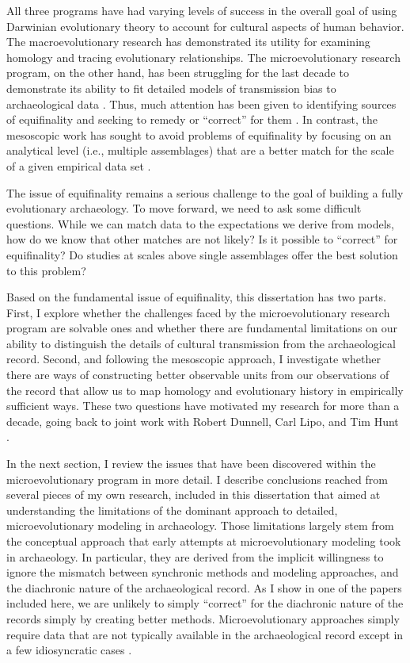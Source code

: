 All three programs have had varying levels of success in the overall goal of using Darwinian evolutionary theory to account for cultural aspects of human behavior. The macroevolutionary research has demonstrated its utility for examining homology and tracing evolutionary relationships. The microevolutionary research program, on the other hand, has been struggling for the last decade to demonstrate its ability to fit detailed models of transmission bias to archaeological data \citep{kandler2019analysing,richerson2008response}. Thus, much attention has been given to identifying sources of equifinality and seeking to remedy or “correct” for them \citep{barrett2019equifinality,premo2010equifinality}. In contrast, the mesoscopic work has sought to avoid problems of equifinality by focusing on an analytical level (i.e., multiple assemblages) that are a better match for the scale of a given empirical data set . 

The issue of equifinality remains a serious challenge to the goal of building a fully evolutionary archaeology.  To move forward, we need to ask some difficult questions.  While we can match data to the expectations we derive from models, how do we know that other matches are not likely?  Is it possible to ``correct'' for equifinality?  Do studies at scales above single assemblages offer the best solution to this problem?  

Based on the fundamental issue of equifinality, this dissertation has two parts.  First, I explore whether the challenges faced by the microevolutionary research program are solvable ones and whether there are fundamental limitations on our ability to distinguish the details of cultural transmission from the archaeological record.  Second, and following the mesoscopic approach, I investigate whether there are ways of constructing better observable units from our observations of the record that allow us to map homology and evolutionary history in empirically sufficient ways. These two questions have motivated my research for more than a decade, going back to joint work with Robert Dunnell, Carl Lipo, and Tim Hunt \citep{Lipo1997,lipomadsen1997,lipomadsenhunt1995b}.  

In the next section, I review the issues that have been discovered within the microevolutionary program in more detail.  I describe conclusions reached from several pieces of my own research, included in this dissertation that aimed at understanding the limitations of the dominant approach to detailed, microevolutionary modeling in archaeology. Those limitations largely stem from the conceptual approach that early attempts at microevolutionary modeling took in archaeology.  In particular, they are derived from the implicit willingness to ignore the mismatch between synchronic methods and modeling approaches, and the diachronic nature of the archaeological record.  As I show in one of the papers included here, we are unlikely to simply ``correct'' for the diachronic nature of the records simply by creating better methods.  Microevolutionary approaches simply require data that are not typically available in the archaeological record except in a few idiosyncratic cases \citep{scholnick2010apprenticeship,Mallios2014}.

